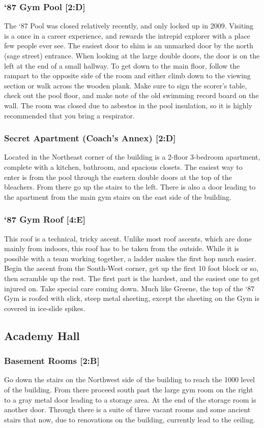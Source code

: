 \documentclass{article}
\begin{document}
\subsubsection{‘87 Gym Pool [2:D]}
The ‘87 Pool was closed relatively recently, and only locked up in 2009. Visiting is a once in a career experience, and rewards the intrepid explorer with a place few people ever see. The easiest door to shim is an unmarked door by the north (sage street) entrance. When looking at the large double doors, the door is on the left at the end of a small hallway. To get down to the main floor, follow the rampart to the opposite side of the room and either climb down to the viewing section or walk across the wooden plank. Make sure to sign the scorer’s table, check out the pool floor, and make note of the old swimming record board on the wall. The room was closed due to asbestos in the pool insulation, so it is highly recommended that you bring a respirator.
\subsubsection{Secret Apartment (Coach’s Annex) [2:D]}
Located in the Northeast corner of the building is a 2-floor 3-bedroom apartment, complete with a kitchen, bathroom, and spacious closets. The easiest way to enter is from the pool through the eastern double doors at the top of the bleachers. From there go up the stairs to the left. There is also a door leading to the apartment from the main gym stairs on the east side of the building.
\subsubsection{‘87 Gym Roof [4:E]}
This roof is a technical, tricky ascent. Unlike most roof ascents, which are done mainly from indoors, this roof has to be taken from the outside. While it is possible with a team working together, a ladder makes the first hop much easier. Begin the ascent from the South-West corner, get up the first 10 foot block or so, then scramble up the rest. The first part is the hardest, and the easiest one to get injured on. Take special care coming down. Much like Greene, the top of the ‘87 Gym is roofed with slick, steep metal sheeting, except the sheeting on the Gym is covered in ice-slide spikes.


\pagebreak
\subsection{Academy Hall}
\subsubsection{Basement Rooms [2:B]}
Go down the stairs on the Northwest side of the building to reach the 1000 level of the building. From there proceed south past the large gym room on the right to a gray metal door leading to a storage area. At the end of the storage room is another door. Through there is a suite of three vacant rooms and some ancient stairs that now, due to renovations on the building, currently lead to the ceiling.
\end{document}
